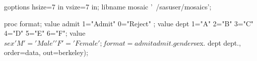 \begin{listing}
goptions hsize=7 in vsize=7 in;
libname mosaic '~/sasuser/mosaics';
 
proc format;
   value admit 1="Admit" 0="Reject" ;
   value dept  1="A" 2="B" 3="C" 4="D" 5="E" 6="F";
   value $sex  'M'='Male'   'F'='Female';
        format=admit admit. gender $sex. dept dept., 
        order=data, out=berkeley);

\end{listing}
